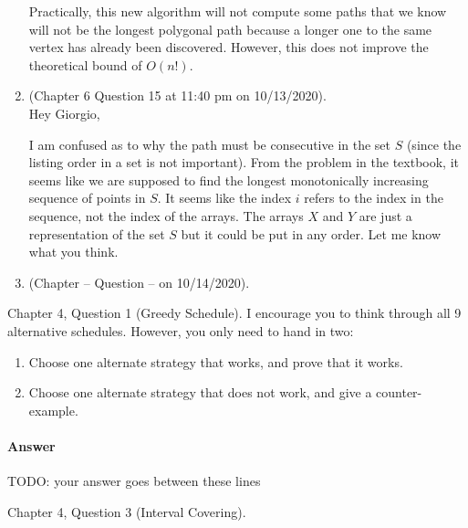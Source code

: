\documentclass{article}
\begin{document}
\begin{enumerate}
        Practically, this new algorithm will not compute some paths that we know will not be the longest polygonal path because a longer one to the same vertex has already been discovered.
        However, this does not improve the theoretical bound of $O(n!)$.
    \item (Chapter 6 Question 15 at 11:40 pm on 10/13/2020). \\
        Hey Giorgio,

        I am confused as to why the path must be consecutive in the set $S$ (since the listing order in a set is not important).
        From the problem in the textbook, it seems like we are supposed to find the longest monotonically increasing sequence of points in $S$.
        It seems like the index $i$ refers to the index in the sequence, not the index of the arrays.
        The arrays $X$ and $Y$ are just a representation of the set $S$ but it could be put in any order.
        Let me know what you think.
    \item (Chapter -- Question -- on 10/14/2020). \\
\end{enumerate}


\nextprob
{}

Chapter 4, Question 1 (Greedy Schedule).  I encourage you to think through all 9
alternative schedules.  However, you only need to hand in two:
\begin{enumerate}
    \item Choose one alternate strategy that
        works, and prove that it works.
    \item Choose one alternate strategy that does not work, and give a
        counter-example.
\end{enumerate}

\paragraph{Answer}

TODO: your answer goes between these lines



\nextprob
{}

Chapter 4, Question 3 (Interval Covering).
\end{document}
